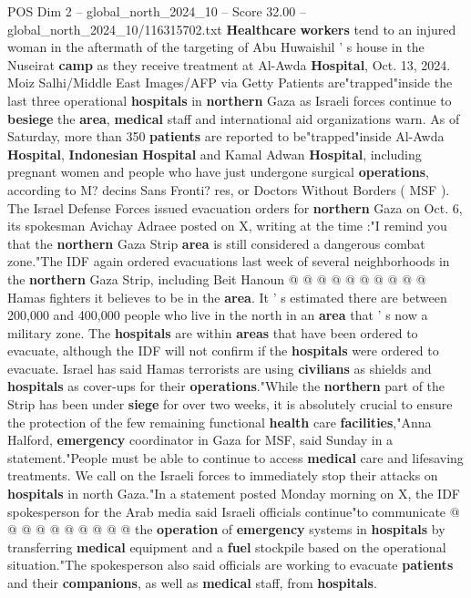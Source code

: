 \begin{textsample}{POS Dim 2 – global\_north\_2024\_10 – Score 32.00 – global\_north\_2024\_10/116315702.txt}  \label{ex:f2_pos_341}
\textbf{Healthcare} \textbf{workers} tend to an injured woman in the aftermath of the targeting of Abu Huwaishil ' s house in the Nuseirat \textbf{camp} as they receive treatment at Al-Awda \textbf{Hospital}, Oct. 13, 2024.
Moiz Salhi/Middle East Images/AFP via Getty Patients are"trapped"inside the last three operational \textbf{hospitals} in \textbf{northern} Gaza as Israeli forces continue to \textbf{besiege} the \textbf{area}, \textbf{medical} staff and international aid organizations warn.
As of Saturday, more than 350 \textbf{patients} are reported to be"trapped"inside Al-Awda \textbf{Hospital}, \textbf{Indonesian} \textbf{Hospital} and Kamal Adwan \textbf{Hospital}, including pregnant women and people who have just undergone surgical \textbf{operations}, according to M? decins Sans Fronti? res, or Doctors Without Borders ( MSF ).
The Israel Defense Forces issued evacuation orders for \textbf{northern} Gaza on Oct. 6, its spokesman Avichay Adraee posted on X, writing at the time :"I remind you that the \textbf{northern} Gaza Strip \textbf{area} is still considered a dangerous combat zone."The IDF again ordered evacuations last week of several neighborhoods in the \textbf{northern} Gaza Strip, including Beit Hanoun @ @ @ @ @ @ @ @ @ @ Hamas fighters it believes to be in the \textbf{area}.
It ' s estimated there are between 200,000 and 400,000 people who live in the north in an \textbf{area} that ' s now a military zone.
The \textbf{hospitals} are within \textbf{areas} that have been ordered to evacuate, although the IDF will not confirm if the \textbf{hospitals} were ordered to evacuate.
Israel has said Hamas terrorists are using \textbf{civilians} as shields and \textbf{hospitals} as cover-ups for their \textbf{operations}."While the \textbf{northern} part of the Strip has been under \textbf{siege} for over two weeks, it is absolutely crucial to ensure the protection of the few remaining functional \textbf{health} care \textbf{facilities},"Anna Halford, \textbf{emergency} coordinator in Gaza for MSF, said Sunday in a statement."People must be able to continue to access \textbf{medical} care and lifesaving treatments.
We call on the Israeli forces to immediately stop their attacks on \textbf{hospitals} in north Gaza."In a statement posted Monday morning on X, the IDF spokesperson for the Arab media said Israeli officials continue"to communicate @ @ @ @ @ @ @ @ @ @ the \textbf{operation} of \textbf{emergency} systems in \textbf{hospitals} by transferring \textbf{medical} equipment and a \textbf{fuel} stockpile based on the operational situation."The spokesperson also said officials are working to evacuate \textbf{patients} and their \textbf{companions}, as well as \textbf{medical} staff, from \textbf{hospitals}.

\end{textsample}
